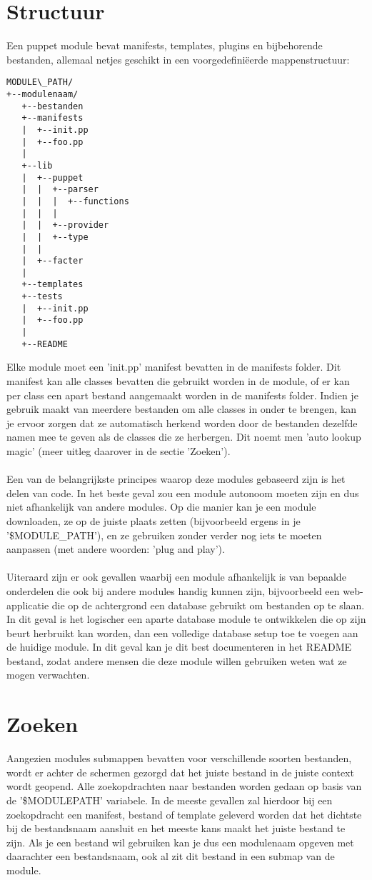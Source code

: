\section{Structuur}
Een puppet module bevat manifests, templates, plugins en bijbehorende bestanden, allemaal netjes geschikt in een voorgedefini\"eerde mappenstructuur:
%
\begin{code}
\begin{lstlisting}
MODULE\_PATH/
+--modulenaam/
   +--bestanden
   +--manifests
   |  +--init.pp
   |  +--foo.pp
   |
   +--lib
   |  +--puppet
   |  |  +--parser
   |  |  |  +--functions
   |  |  |
   |  |  +--provider
   |  |  +--type
   |  |
   |  +--facter
   |
   +--templates
   +--tests
   |  +--init.pp
   |  +--foo.pp
   |
   +--README
\end{lstlisting}
\end{code}
%
Elke module moet een 'init.pp' manifest bevatten in de manifests folder. Dit manifest kan alle classes bevatten die gebruikt worden in de module, of er kan per class een apart bestand aangemaakt worden in de manifests folder. Indien je gebruik maakt van meerdere bestanden om alle classes in onder te brengen, kan je ervoor zorgen dat ze automatisch herkend worden door de bestanden dezelfde namen mee te geven als de classes die ze herbergen. Dit noemt men 'auto lookup magic' (meer uitleg daarover in de sectie 'Zoeken').\\\\
%
Een van de belangrijkste principes waarop deze modules gebaseerd zijn is het delen van code. In het beste geval zou een module autonoom moeten zijn en dus niet afhankelijk van andere modules. Op die manier kan je een module downloaden, ze op de juiste plaats zetten (bijvoorbeeld ergens in je '\$MODULE\_PATH'), en ze gebruiken zonder verder nog iets te moeten aanpassen (met andere woorden: 'plug and play').\\\\
%
Uiteraard zijn er ook gevallen waarbij een module afhankelijk is van bepaalde onderdelen die ook bij andere modules handig kunnen zijn, bijvoorbeeld een web-applicatie die op de achtergrond een database gebruikt om bestanden op te slaan. In dit geval is het logischer een aparte database module te ontwikkelen die op zijn beurt herbruikt kan worden, dan een volledige database setup toe te voegen aan de huidige module. In dit geval kan je dit best documenteren in het README bestand, zodat andere mensen die deze module willen gebruiken weten wat ze mogen verwachten.
%
\section{Zoeken}
Aangezien modules submappen bevatten voor verschillende soorten bestanden, wordt er achter de schermen gezorgd dat het juiste bestand in de juiste context wordt geopend. Alle zoekopdrachten naar bestanden worden gedaan op basis van de '\$MODULEPATH' variabele. In de meeste gevallen zal hierdoor bij een zoekopdracht een manifest, bestand of template geleverd worden dat het dichtste bij de bestandsnaam aansluit en het meeste kans maakt het juiste bestand te zijn. Als je een bestand wil gebruiken kan je dus een modulenaam opgeven met daarachter een bestandsnaam, ook al zit dit bestand in een submap van de module.

